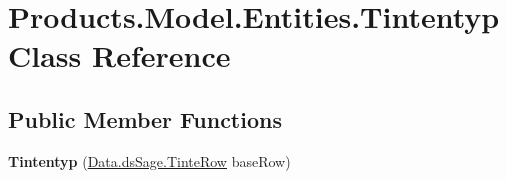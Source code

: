 \hypertarget{class_products_1_1_model_1_1_entities_1_1_tintentyp}{}\section{Products.\+Model.\+Entities.\+Tintentyp Class Reference}
\label{class_products_1_1_model_1_1_entities_1_1_tintentyp}
\subsection*{Public Member Functions}
\begin{DoxyCompactItemize}
\item 
{\bfseries Tintentyp} (\hyperlink{class_products_1_1_data_1_1ds_sage_1_1_tinte_row}{Data.\+ds\+Sage.\+Tinte\+Row} base\+Row)\hypertarget{class_products_1_1_model_1_1_entities_1_1_tintentyp_a1290f654a677ae39dffd4aa736085816}{}\label{class_products_1_1_model_1_1_entities_1_1_tintentyp_a1290f654a677ae39dffd4aa736085816}

\end{DoxyCompactItemize}
